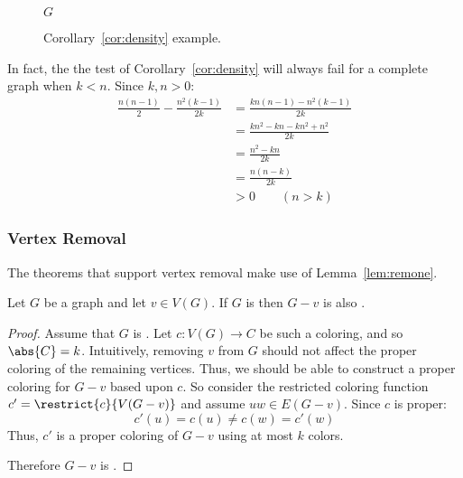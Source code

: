 \begin{figure}[H]
  \centering

  \(G\)
  \caption{Corollary~\ref{cor:density} example.}
  \label{fig:density}
\end{figure}

In fact, the the test of Corollary~\ref{cor:density} will always fail for a complete graph when \(k<n\).  Since
\(k,n>0\):
\begin{align*}
  \frac{n(n-1)}{2}-\frac{n^2(k-1)}{2k} &= \frac{kn(n-1)-n^2(k-1)}{2k} \\
  &= \frac{kn^2-kn-kn^2+n^2}{2k} \\
  &= \frac{n^2-kn}{2k} \\
  &= \frac{n(n-k)}{2k} \\
  &>0\qquad(n>k)
\end{align*}

\subsubsection{Vertex Removal}\label{sec:sub:sub:vertex}

The theorems that support vertex removal make use of Lemma~\ref{lem:remone}.

\begin{lemma}
  \label{lem:remone}
  Let \(G\) be a graph and let \(v\in V(G)\).  If \(G\) is  then \(G-v\) is also .
\end{lemma}

\begin{proof}
  Assume that \(G\) is .  Let \(c:V(G)\to C\) be such a coloring, and so \(\abs{C}=k\).  Intuitively,
  removing \(v\) from \(G\) should not affect the proper coloring of the remaining vertices.  Thus, we should be
  able to construct a proper coloring for \(G-v\) based upon \(c\).  So consider the restricted coloring function
  \(c'=\restrict{c}{V(G-v)}\) and assume \(uw\in E(G-v)\).  Since \(c\) is proper:
  \[c'(u)=c(u)\ne c(w)=c'(w)\]
  Thus, \(c'\) is a proper coloring of \(G-v\) using at most \(k\) colors.

  Therefore \(G-v\) is .
\end{proof}

